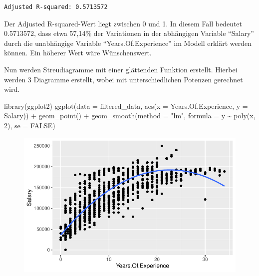 \documentclass[
  letterpaper,
  DIV=11,
  numbers=noendperiod]{scrartcl}
\newenvironment{Shaded}{\begin{snugshade}}{\end{snugshade}}
\newcommand{\AttributeTok}[1]{\textcolor[rgb]{0.40,0.45,0.13}{#1}}
\newcommand{\ConstantTok}[1]{\textcolor[rgb]{0.56,0.35,0.01}{#1}}
\newcommand{\DecValTok}[1]{\textcolor[rgb]{0.68,0.00,0.00}{#1}}
\newcommand{\FunctionTok}[1]{\textcolor[rgb]{0.28,0.35,0.67}{#1}}
\newcommand{\NormalTok}[1]{\textcolor[rgb]{0.00,0.23,0.31}{#1}}
\newcommand{\SpecialCharTok}[1]{\textcolor[rgb]{0.37,0.37,0.37}{#1}}
\newcommand{\StringTok}[1]{\textcolor[rgb]{0.13,0.47,0.30}{#1}}
\begin{document}
\begin{verbatim}
Adjusted R-squared: 0.5713572 
\end{verbatim}

Der Adjusted R-squared-Wert liegt zwischen 0 und 1. In diesem Fall
bedeutet 0.5713572, dass etwa 57,14\% der Variationen in der abhängigen
Variable ``Salary'' durch die unabhängige Variable
``Years.Of.Experience'' im Modell erklärt werden können. Ein höherer
Wert wäre Wünschenswert.

Nun werden Streudiagramme mit einer glättenden Funktion erstellt.
Hierbei werden 3 Diagramme erstellt, wobei mit unterschiedlichen
Potenzen gerechnet wird.

\begin{Shaded}
\begin{Highlighting}[]
\FunctionTok{library}\NormalTok{(ggplot2)}
\FunctionTok{ggplot}\NormalTok{(}\AttributeTok{data =}\NormalTok{ filtered\_data, }\FunctionTok{aes}\NormalTok{(}\AttributeTok{x =}\NormalTok{ Years.Of.Experience, }\AttributeTok{y =}\NormalTok{ Salary)) }\SpecialCharTok{+}
  \FunctionTok{geom\_point}\NormalTok{() }\SpecialCharTok{+}
  \FunctionTok{geom\_smooth}\NormalTok{(}\AttributeTok{method =} \StringTok{"lm"}\NormalTok{, }\AttributeTok{formula =}\NormalTok{ y }\SpecialCharTok{\textasciitilde{}} \FunctionTok{poly}\NormalTok{(x, }\DecValTok{2}\NormalTok{), }\AttributeTok{se =} \ConstantTok{FALSE}\NormalTok{)}
\end{Highlighting}
\end{Shaded}

\begin{figure}[H]

{\centering \includegraphics{main_doc_files/figure-pdf/unnamed-chunk-124-1.pdf}

}

\end{figure}
\end{document}
